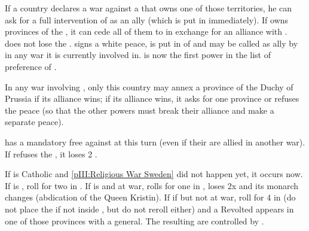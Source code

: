 \phdipl
\aparag If a country declares a war against a \MAJ that owns one of those
territories, he can ask for a full intervention of \paysBrandebourg as an ally
(which is put in \EW immediately).
\aparag If \POL owns provinces of the , it can cede
all of them to \paysBrandebourg in exchange for an alliance with
\paysBrandebourg. \POL does not lose the \PV.  \paysBrandebourg signs a white
peace, is put in \EW of \POL and may be called as ally by \POL in any war it
is currently involved in.
\bparag \POL is now the first power in the list of preference of
\paysBrandebourg.

\phpaix
\aparag In any war involving \paysBrandebourg, only this country may annex a
province of the Duchy of Prussia if its alliance wins; if its alliance wins,
it asks for one province or refuses the peace (so that the other powers must
break their alliance and make a separate peace).













\phevnt
\aparag \SUE has a mandatory free \CB against \paysDanemark at this turn (even
if their are allied in another war).
\aparag If \SUE refuses the \CB, it loses 2 \STAB.





\phevnt
\aparag If \SUE is Catholic and \ref{pIII:Religious War Sweden} did not happen
yet, it occurs now.
\aparag If \SUE is \PROTRIG, roll for two \REVOLT in \SUE.
\aparag If \SUE is \PROTTOL and at war, rolls for one \REVOLT in \SUE, \SUE
loses 2x \STAB and its monarch changes (abdication of the Queen Kristin).
\aparag If \SUE if \PROTTOL but not at war, roll for 4 \REVOLT in \SUE (do not
place the \REVOLT if not inside \SUE, but do not reroll either) and a Revolted
\ARMY appears in one of those provinces with a general.
\aparag The resulting \REVOLT are controlled by \SPA.




